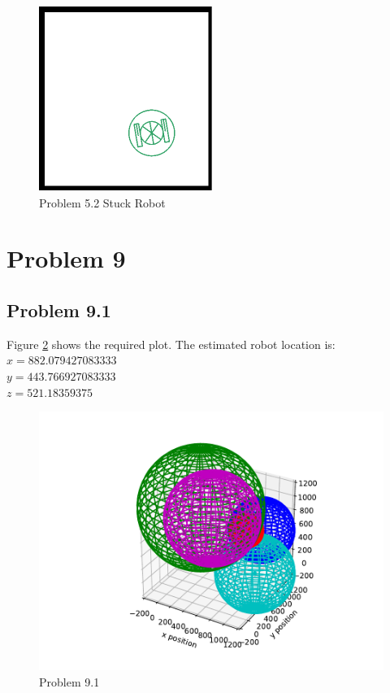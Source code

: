 \documentclass{article}
\begin{document}
\begin{figure}[h]
    \centering
    \includegraphics[pages=1]{stuck1}
    \caption{Problem 5.2 Stuck Robot}
    \label{fig:stuck1}
\end{figure}

\newpage
\section{\textbf{Problem 9}}
\subsection{Problem 9.1}
Figure \ref{fig:9.1} shows the required plot. The estimated robot location is:\\
$x = 882.079427083333$\\
$y = 443.766927083333$\\
$z = 521.18359375$\\

\begin{figure}[h]
    \centering
    \includegraphics[pages=1]{problem9-1}
    \caption{Problem 9.1}
    \label{fig:9.1}
\end{figure}
\end{document}
